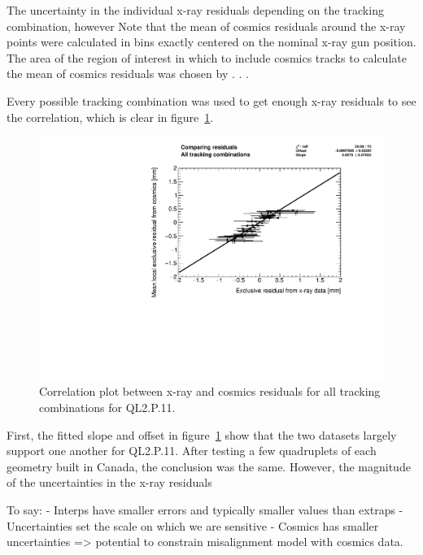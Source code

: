 The uncertainty in the individual x-ray residuals depending on the tracking combination, however
Note that the mean of cosmics residuals around the x-ray points were calculated in bins exactly centered on the nominal x-ray gun position. The area of the region of interest in which to include cosmics tracks to calculate the mean of cosmics residuals was chosen by . . . 

Every possible tracking combination was used to get enough x-ray residuals to see the correlation, which is clear in figure~\ref{fig:correlation}.

\begin{figure}
    \centering
    \includegraphics[width = \textwidth]{figures/QL2P11_3100V_2021-08-05_local_mean_cosmics_residual_vs_xray_residual_scatter_all.pdf}
    \caption{Correlation plot between x-ray and cosmics residuals for all tracking combinations for QL2.P.11. }
    \label{fig:correlation}
\end{figure}

First, the fitted slope and offset in figure~\ref{fig:correlation} show that the two datasets largely support one another for QL2.P.11. After testing a few quadruplets of each geometry built in Canada, the conclusion was the same. However, the magnitude of the uncertainties in the x-ray residuals

To say:
- Interps have smaller errors and typically smaller values than extraps
- Uncertainties set the scale on which we are sensitive
- Cosmics has smaller uncertainties => potential to constrain misalignment model with cosmics data.



